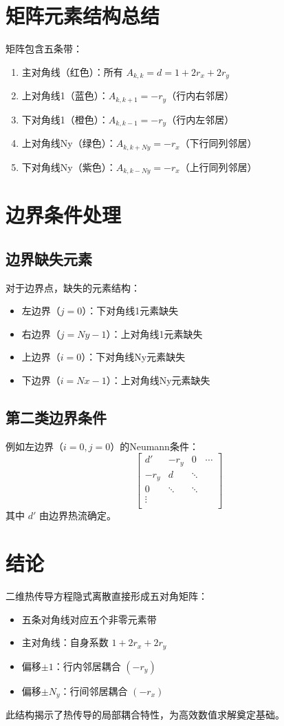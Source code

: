 \documentclass[UTF8]{ctexart}
\begin{document}
\section{矩阵元素结构总结}
\label{sec:matrix_structure}

矩阵包含五条带：
\begin{enumerate}
\item 主对角线（红色）：所有 $A_{k,k} = d = 1 + 2r_x + 2r_y$
\item 上对角线1（蓝色）：$A_{k,k+1} = -r_y$（行内右邻居）
\item 下对角线1（橙色）：$A_{k,k-1} = -r_y$（行内左邻居）
\item 上对角线Ny（绿色）：$A_{k,k+Ny} = -r_x$（下行同列邻居）
\item 下对角线Ny（紫色）：$A_{k,k-Ny} = -r_x$（上行同列邻居）
\end{enumerate}

\section{边界条件处理}
\label{sec:boundary_conditions}

\subsection{边界缺失元素}
对于边界点，缺失的元素结构：
\begin{itemize}
\item 左边界（$j=0$）：下对角线1元素缺失
\item 右边界（$j=Ny-1$）：上对角线1元素缺失
\item 上边界（$i=0$）：下对角线Ny元素缺失
\item 下边界（$i=Nx-1$）：上对角线Ny元素缺失
\end{itemize}

\subsection{第二类边界条件}
例如左边界（$i=0, j=0$）的Neumann条件：
$$
\begin{bmatrix}
d' & -r_y & 0 & \cdots \\
-r_y & d & \ddots & \\
0 & \ddots & \ddots & \\
\vdots & & & \\
\end{bmatrix}
$$
其中 $d'$ 由边界热流确定。

\section{结论}
二维热传导方程隐式离散直接形成五对角矩阵：
\begin{itemize}
\item 五条对角线对应五个非零元素带
\item 主对角线：自身系数 $1 + 2r_x + 2r_y$
\item 偏移$\pm 1$：行内邻居耦合 $(-r_y)$
\item 偏移$\pm N_y$：行间邻居耦合 $(-r_x)$
\end{itemize}
此结构揭示了热传导的局部耦合特性，为高效数值求解奠定基础。
\end{document}

